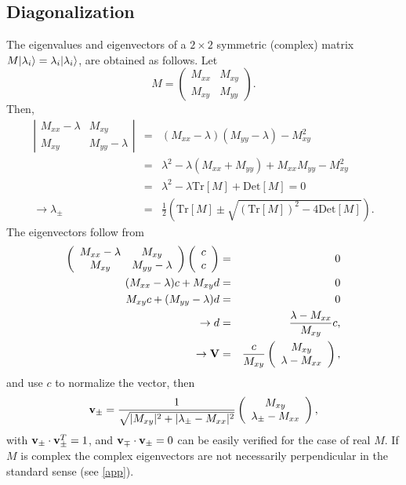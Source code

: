 \documentclass[preprint,12pt]{revtex4}
\begin{document}
\subsection{Diagonalization}
The eigenvalues and eigenvectors of a $2\times 2$ symmetric (complex) matrix
$M| \lambda_i \rangle=\lambda_i| \lambda_i \rangle$, are obtained as follows. Let
\begin{equation}\label{h.1}
M=\left(\begin{array}{cc} 
M_{xx}&M_{xy}\\ 
M_{xy}&M_{yy}
\end{array}\right)
.
\end{equation} 
Then,
\begin{eqnarray}\label{h.29}
\left|\begin{array}{cc}
M_{xx}-\lambda&M_{xy}\\
M_{xy}&M_{yy}-\lambda
\end{array}\right|
&=&(M_{xx}-\lambda)(M_{yy}-\lambda) -M^2_{xy}
\nonumber\\
&=&
\lambda^2-\lambda(M_{xx}+M_{yy})+M_{xx}M_{yy}-M^2_{xy}
\nonumber\\
&=&
\lambda^2-\lambda 
\mathrm{Tr}[M]
+
\mathrm{Det}[M]
=0
\nonumber\\
\to\lambda_{\pm}&=&
\frac{1}{2}\left(
\mathrm{Tr}[M]
\pm\sqrt{(\mathrm{Tr}[M])^2-4 \mathrm{Det}[M]}
\right)
.
\end{eqnarray}
The eigenvectors follow from
\begin{eqnarray}\label{h.1}
\left(\begin{array}{cc}
M_{xx}-\lambda&M_{xy}\\
M_{xy}&M_{yy}-\lambda
\end{array}\right)
\left(\begin{array}{c}
c\\
c
\end{array}\right)
&=&0
\nonumber\\
(M_{xx}-\lambda)c+M_{xy}d&=&0
\nonumber\\
M_{xy}c+(M_{yy}-\lambda)d&=&0
\nonumber\\
\to d&=&\frac{\lambda-M_{xx}}{M_{xy}}c,
\nonumber\\
\to
 \mathbf{V}
&=&
\frac{c}{M_{xy}}\left(\begin{array}{c}
M_{xy}\\
\lambda-M_{xx}
\end{array}\right)
,
\end{eqnarray}
and use $c$ to normalize the vector, then
\begin{equation}\label{h.3}
 \mathbf{v}_\pm
=
\frac{1}{\sqrt{|M_{xy}|^2+|\lambda_\pm-M_{xx}|^2}}
\left(\begin{array}{c}
M_{xy}\\
\lambda_\pm-M_{xx}
\end{array}\right)
,
\end{equation}
with $\mathbf{v}_\pm\cdot\mathbf{v}_\pm^T=1$,
and $\mathbf{v}_\mp\cdot\mathbf{v}_\pm=0$ can be easily verified for the case of
real $M$. If $M$ is complex the complex eigenvectors are not
necessarily perpendicular in the standard sense (see \ref{app}).  
\end{document}
